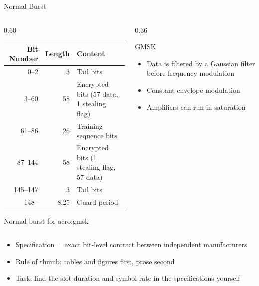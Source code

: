 \begin{frame}{Normal Burst}
  \begin{columns}[T,onlytextwidth]
    \begin{column}{0.60\textwidth}
      \centering
      \footnotesize
      \begin{tabular}{rrl}
        \toprule
        \textbf{Bit Number} & \textbf{Length} & \textbf{Content} \\
        \midrule
        0--2 & 3 & Tail bits \\
        3--60 & 58 & Encrypted bits (57 data, 1 stealing flag) \\
        61--86 & 26 & Training sequence bits \\
        87--144 & 58 & Encrypted bits (1 stealing flag, 57 data) \\
        145--147 & 3 & Tail bits \\
        148-- & 8.25 & Guard period \\
        \bottomrule
      \end{tabular}

      \vspace{0.3em}
      \normalsize
      Normal burst for \gls{acro:gmsk}~\cite{etsi.145.001.v18}
    \end{column}
    \begin{column}{0.36\textwidth}
      \begin{block}{GMSK}
        \begin{itemize}
          \item Data is filtered by a Gaussian filter before frequency modulation
          \item Constant envelope modulation
          \item Amplifiers can run in saturation
        \end{itemize}
      \end{block}
    \end{column}
  \end{columns}
  \vspace{0.5em}
  \begin{itemize}
    \item Specification = exact bit-level contract between independent manufacturers
    \item Rule of thumb: tables and figures first, prose second
    \item Task: find the slot duration and symbol rate in the specifications yourself
  \end{itemize}
\end{frame}

